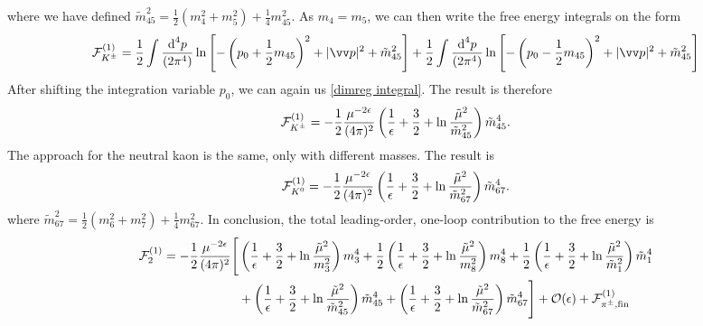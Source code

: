 %
where we have defined 
$
\tilde m_{45}^2 = \frac{1}{2}(m_4^2 + m_5^2) + \frac{1}{4} m_{45}^2.
$
As $m_4 = m_5$, we can then write the free energy integrals on the form
%
\begin{equation} 
    \nonumber
    \Eff_\Kpm^{(1)}
    =
    \frac{1}{2} \int \frac{\dd^4 p}{(2\pi^4)}
    \ln \left[
        - \left(p_0 + \frac{1}{2}m_{45}\right)^2 
        + |\vv p|^2 
        + \tilde m_{45}^2 
    \right]
    +
    \frac{1}{2}
    \int \frac{\dd^4 p}{(2\pi^4)}
    \ln \left[
        - \left(p_0 - \frac{1}{2}m_{45}\right)^2 
        + |\vv p|^2 
        + \tilde m_{45}^2 
    \right]
\end{equation}
%
After shifting the integration variable $p_0$, we can again us \autoref{dimreg integral}.
The result is therefore
%
\begin{equation}
    \mathcal{F}_{K^\pm}^{(1)}
    =
    - \frac{1}{2} \frac{\mu^{-2 \epsilon} }{(4\pi)^2} 
    \left(
        \frac{1}{\epsilon} + \frac{3}{2} + \ln \frac{\tilde \mu^2}{\tilde m_{45}^2}
    \right)\tilde m_{45}^4.
\end{equation}
%
The approach for the neutral kaon is the same, only with different masses.
The result is
%
\begin{equation}
    \mathcal{F}_{K^0}^{(1)}
    =
    - \frac{1}{2} \frac{ \mu^{-2 \epsilon}}{(4\pi)^2} 
    \left(
        \frac{1}{\epsilon} + \frac{3}{2} + \ln \frac{\tilde \mu^2}{\tilde m_{67}^2}
    \right)\tilde m_{67}^4.
\end{equation}
%
where
$
\tilde m_{67}^2 = \frac{1}{2}(m_6^2 + m_7^2) + \frac{1}{4} m_{67}^2.
$
In conclusion, the total leading-order, one-loop contribution to the free energy is
%
\begin{align}
    \label{one-loop free energy}
    \nonumber
    \mathcal{F}^{(1)}_2
    =
    -\frac{1}{2} \frac{  \mu^{-2\epsilon}}{(4 \pi)^2} 
    \Bigg[&
        \left(
            \frac{1}{\epsilon} + \frac{3}{2} + \ln\frac{\tilde \mu^2}{m_3^2}
        \right)
        m_3^4
        +
        \frac{1}{2}
        \left(
            \frac{1}{\epsilon} + \frac{3}{2} + \ln\frac{\tilde \mu^2}{m_8^2} 
        \right)
        m_8^4+
        \frac{1}{2}
        \left(
            \frac{1}{\epsilon} + \frac{3}{2} + \ln\frac{\tilde \mu^2}{\tilde m_1^2}
        \right)
        \tilde m_1^4 \\ \nonumber
        & +
        \left(
            \frac{1}{\epsilon} + \frac{3}{2} + \ln\frac{\tilde \mu^2}{\tilde m_{45}^2}
        \right)
        \tilde m_{45}^4
        +
        \left(
            \frac{1}{\epsilon} + \frac{3}{2} + \ln\frac{\tilde \mu^2}{\tilde m_{67}^2} 
        \right)
        \tilde m_{67}^4
    \Bigg]
    + \mathcal O(\epsilon)
    + \mathcal{F}^{(1)}_{{\pi^\pm},\text{fin}}
\end{align}





